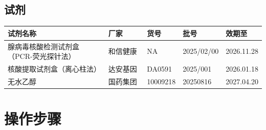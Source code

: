 \documentclass[UTF8,10pt,a4paper,fontset=fandol]{ctexart}
\newcommand{\fieldvalue}[1]{#1}
\newcommand{\handwritten}[1]{#1}
\begin{document}
\subsection{试剂}

\begin{center}
\begin{tabular}{|p{0.42\linewidth}|p{0.16\linewidth}|p{0.13\linewidth}|p{0.16\linewidth}|p{0.13\linewidth}|}
\hline
试剂名称 & 厂家 & 货号 & 批号 & 效期至\\
\hline
腺病毒核酸检测试剂盒（PCR-荧光探针法） & 和信健康 & NA &
\fieldvalue{\handwritten{2025/02/00}} &
\fieldvalue{\handwritten{2026.11.28}}\\
\hline
核酸提取试剂盒（离心柱法） & 达安基因 & DA0591 &
\fieldvalue{\handwritten{2025/001}} &
\fieldvalue{\handwritten{2026.01.18}}\\
\hline
无水乙醇 & 国药集团 & 10009218 &
\fieldvalue{\handwritten{20250816}} &
\fieldvalue{\handwritten{2027.04.20}}\\
\hline
\end{tabular}
\end{center}

\section{操作步骤}
\end{document}
